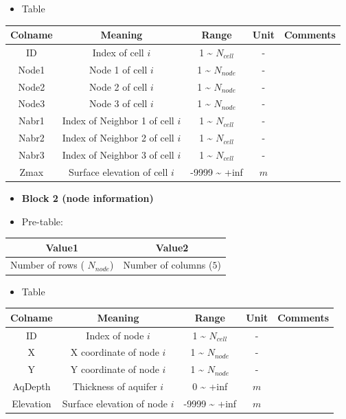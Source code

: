 \documentclass[]{scrbook}
\providecommand{\tightlist}{%
  \setlength{\itemsep}{0pt}\setlength{\parskip}{0pt}}
\begin{document}
\begin{itemize}
\tightlist
\item
  Table
\end{itemize}

\begin{longtable}[]{@{}ccccc@{}}
\toprule
Colname & Meaning & Range & Unit & Comments\tabularnewline
\midrule
\endhead
ID & Index of cell \(i\) & 1 \textasciitilde{} \(N_{cell}\) & -
&\tabularnewline
Node1 & Node 1 of cell \(i\) & 1 \textasciitilde{} \(N_{node}\) & -
&\tabularnewline
Node2 & Node 2 of cell \(i\) & 1 \textasciitilde{} \(N_{node}\) & -
&\tabularnewline
Node3 & Node 3 of cell \(i\) & 1 \textasciitilde{} \(N_{node}\) & -
&\tabularnewline
Nabr1 & Index of Neighbor 1 of cell \(i\) & 1 \textasciitilde{}
\(N_{cell}\) & - &\tabularnewline
Nabr2 & Index of Neighbor 2 of cell \(i\) & 1 \textasciitilde{}
\(N_{cell}\) & - &\tabularnewline
Nabr3 & Index of Neighbor 3 of cell \(i\) & 1 \textasciitilde{}
\(N_{cell}\) & - &\tabularnewline
Zmax & Surface elevation of cell \(i\) & -9999 \textasciitilde{} +inf &
\(m\) &\tabularnewline
\bottomrule
\end{longtable}

\begin{itemize}
\item
  \textbf{Block 2 (node information)}
\item
  Pre-table:
\end{itemize}

\begin{longtable}[]{@{}cc@{}}
\toprule
Value1 & Value2\tabularnewline
\midrule
\endhead
Number of rows ( \(N_{node}\)) & Number of columns
(\(5\))\tabularnewline
\bottomrule
\end{longtable}

\begin{itemize}
\tightlist
\item
  Table
\end{itemize}

\begin{longtable}[]{@{}ccccc@{}}
\toprule
Colname & Meaning & Range & Unit & Comments\tabularnewline
\midrule
\endhead
ID & Index of node \(i\) & 1 \textasciitilde{} \(N_{cell}\) & -
&\tabularnewline
X & X coordinate of node \(i\) & 1 \textasciitilde{} \(N_{node}\) & -
&\tabularnewline
Y & Y coordinate of node \(i\) & 1 \textasciitilde{} \(N_{node}\) & -
&\tabularnewline
AqDepth & Thickness of aquifer \(i\) & 0 \textasciitilde{} +inf & \(m\)
&\tabularnewline
Elevation & Surface elevation of node \(i\) & -9999 \textasciitilde{}
+inf & \(m\) &\tabularnewline
\bottomrule
\end{longtable}
\end{document}
